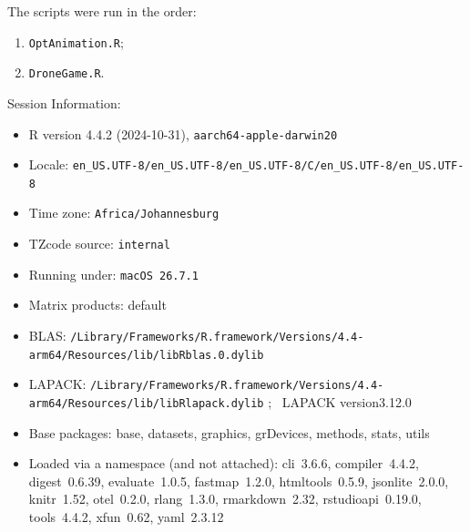 \documentclass[
  a4paper,
]{article}
\providecommand{\tightlist}{%
  \setlength{\itemsep}{0pt}\setlength{\parskip}{0pt}}\usepackage{longtable,booktabs,array}
\newcommand{\+}{\phantom{-}}
\begin{document}
The scripts were run in the order:

\begin{enumerate}
\def\labelenumi{\arabic{enumi}.}
\tightlist
\item
  \texttt{OptAnimation.R};
\item
  \texttt{DroneGame.R}.
\end{enumerate}

Session Information:

\begin{itemize}\raggedright
  \item R version 4.4.2 (2024-10-31), \verb|aarch64-apple-darwin20|
  \item Locale: \verb|en_US.UTF-8/en_US.UTF-8/en_US.UTF-8/C/en_US.UTF-8/en_US.UTF-8|
  \item Time zone: \verb|Africa/Johannesburg|
  \item TZcode source: \verb|internal|
  \item Running under: \verb|macOS 26.7.1|
  \item Matrix products: default
  \item BLAS:   \verb|/Library/Frameworks/R.framework/Versions/4.4-arm64/Resources/lib/libRblas.0.dylib|
  \item LAPACK: \verb|/Library/Frameworks/R.framework/Versions/4.4-arm64/Resources/lib/libRlapack.dylib|
; \quad\ LAPACK version3.12.0
  \item Base packages: base, datasets, graphics, grDevices, methods,
    stats, utils
  \item Loaded via a namespace (and not attached): cli~3.6.6,
    compiler~4.4.2, digest~0.6.39, evaluate~1.0.5, fastmap~1.2.0,
    htmltools~0.5.9, jsonlite~2.0.0, knitr~1.52, otel~0.2.0,
    rlang~1.3.0, rmarkdown~2.32, rstudioapi~0.19.0, tools~4.4.2,
    xfun~0.62, yaml~2.3.12
\end{itemize}
\end{document}
